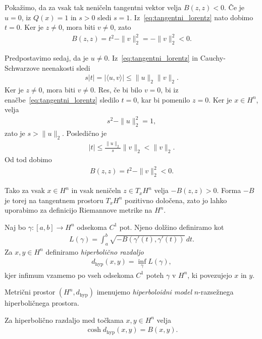\documentclass[mat2, tisk]{fmfdelo}
\begin{document}
Pokažimo, da za vsak tak neničeln tangentni vektor velja
$B(z,z)<0$. Če je $u=0$, iz $Q(x)=1$ in $s>0$ sledi $s=1$.
Iz~\eqref{eq:tangentni_lorentz} nato dobimo $t=0$. Ker je $z\neq0$,
mora biti $v\neq0$, zato
\begin{align*}
B(z,z)
=
t^2-\|v\|_2^2
=
-\|v\|_2^2
<0.
\end{align*}

Predpostavimo sedaj, da je $u\neq0$. Iz~\eqref{eq:tangentni_lorentz}
in Cauchy-Schwarzove neenakosti sledi
\begin{align*}
s|t|
=
|\langle u,v\rangle|
\leq
\|u\|_2\|v\|_2.
\end{align*}
Ker je $z\neq0$, mora biti $v\neq0$.
Res, če bi bilo $v=0$, bi iz
enačbe~\eqref{eq:tangentni_lorentz}
sledilo $t=0$, kar bi pomenilo $z=0$.
Ker je $x\in H^n$, velja
\begin{align*}
s^2-\|u\|_2^2=1,
\end{align*}
zato je $s>\|u\|_2$. Posledično je 
\begin{align*}
|t|
\leq
\frac{\|u\|_2}{s}\|v\|_2
<
\|v\|_2.
\end{align*}
Od tod dobimo
\begin{align*}
B(z,z)
=
t^2-\|v\|_2^2
<0.
\end{align*}

Tako za vsak $x\in H^n$ in vsak neničeln
$z\in T_x H^n$ velja $-B(z,z)>0$. Forma $-B$ je torej na
tangentnem prostoru $T_x H^n$ pozitivno določena, zato jo lahko
uporabimo za definicijo Riemannove metrike na $H^n$.

\begin{definicija}
Naj bo $\gamma:[a,b]\longrightarrow H^n$ odsekoma $C^1$ pot.
Njeno dolžino definiramo kot
\begin{align*}
L(\gamma)
=
\int_a^b
\sqrt{-B(\gamma'(t),\gamma'(t))}\,dt.
\end{align*}
Za $x,y\in H^n$ definiramo \emph{hiperbolično razdaljo}
\begin{align*}
d_{\mathrm{hyp}}(x,y)
=
\inf\limits_{\gamma}L(\gamma),
\end{align*}
kjer infimum vzamemo po vseh odsekoma $C^1$ poteh $\gamma$ v $H^n$,
ki povezujejo $x$ in $y$.

Metrični prostor $(H^n,d_{\mathrm{hyp}})$ imenujemo
\emph{hiperboloidni model} $n$-razsežnega hiperboličnega prostora.
\end{definicija}

Za hiperbolično razdaljo med točkama $x,y\in H^n$ velja
\begin{align}
\cosh d_{\mathrm{hyp}}(x,y)
=
B(x,y).
\label{eq:hiperbolicna_razdalja}
\end{align}
\end{document}
